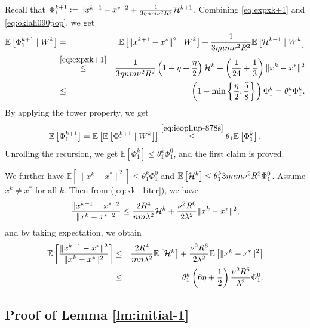 \documentclass[10pt]{article}
\newcommand{\eqdef}{\; { := }\;}
\newcommand{\ExpBr}[1]{\mathbb{E}\left[#1\right]}
\begin{document}
Recall that $\Phi_1^{k+1} \eqdef \|x^{k+1} - x^*\|^2 + \frac{1}{3\eta nm  \nu^2 R^2} {\cal H}^{k+1}$. Combining \eqref{eq:expxk+1} and \eqref{eq:oklah090pop}, we get
\begin{eqnarray}
	\ExpBr{ \Phi_1^{k+1} \;|\; W^k} &=& \ExpBr{ \|x^{k+1} - x^*\|^2 \;|\; W^k} + \frac{1}{3\eta nm  \nu^2 R^2}  \ExpBr{ {\cal H}^{k+1} \;|\; W^k}  \notag\\ 
	&\overset{\eqref{eq:expxk+1}}\leq&  \frac{1}{3\eta nm  \nu^2 R^2} \left(  1 - \eta + \frac{\eta}{2}  \right) {\cal H}^k  + \left(  \frac{1}{24} + \frac{1}{3}  \right)  \|x^k - x^*\|^2  \notag \\ 
	&\leq& \left(  1 - \min \left\{  \frac{\eta}{2}, \frac{5}{8}  \right\}  \right)  \Phi_1^k = \theta_1^k \Phi_1^k. \label{eq:ieopllup-878s}
\end{eqnarray}
By applying the tower property, we get $$\ExpBr{\Phi_1^{k+1}} = \ExpBr{\ExpBr{ \Phi_1^{k+1} \;|\; W^k}} \overset{\eqref{eq:ieopllup-878s}}{\leq} \theta_1 \ExpBr{\Phi_1^k}.$$ Unrolling the recursion, we get   $\ExpBr{\Phi_1^k } \leq  
\theta_1^k  \Phi_1^0$, and the first claim is proved.

We further have $\ExpBr{ \|x^k - x^*\|^2 } \leq \theta_1^k \Phi_1^0$ and $\ExpBr{{\cal H}^k} \leq  \theta_1^k 3\eta nm \nu^2 R^2 \Phi_1^0$. Assume $x^k \neq x^*$ for all $k$. Then from (\ref{eq:xk+1iter}), we have 
$$
\frac{\|x^{k+1} - x^*\|^2}{\|x^k - x^*\|^2 } \leq \frac{2R^4}{nm \lambda^2} {\cal H}^k + \frac{\nu^2 R^6}{2\lambda^2}\|x^k - x^*\|^2, 
$$
and by taking expectation, we obtain 
\begin{eqnarray*}
	\ExpBr{  \frac{\|x^{k+1} - x^*\|^2}{\|x^k - x^*\|^2 }  } &\leq& \frac{2R^4}{mn \lambda^2} \ExpBr{{\cal H}^k } + \frac{\nu^2 R^6}{2\lambda^2} \ExpBr{ \|x^k - x^*\|^2 } \\ 
	&\leq&\theta_1^k  \left(  {6\eta} + \frac{1}{2}  \right) \frac{\nu^2 R^6}{\lambda^2} \Phi_1^0. 
\end{eqnarray*}



\subsection{Proof of Lemma \ref{lm:initial-1}}
\end{document}
